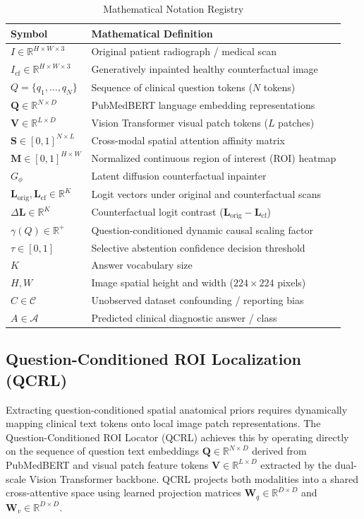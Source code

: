\documentclass[journal,twoside,web]{ieeecolor}
\begin{document}
\begin{table}[h]
\caption{Mathematical Notation Registry}
\label{tab:notation}
\centering
\begin{tabular}{ll}
\toprule
\textbf{Symbol} & \textbf{Mathematical Definition} \\
\midrule
$I \in \mathbb{R}^{H \times W \times 3}$ & Original patient radiograph / medical scan \\
$I_{\text{cf}} \in \mathbb{R}^{H \times W \times 3}$ & Generatively inpainted healthy counterfactual image \\
$Q = \{q_1, \dots, q_N\}$ & Sequence of clinical question tokens ($N$ tokens) \\
$\mathbf{Q} \in \mathbb{R}^{N \times D}$ & PubMedBERT language embedding representations \\
$\mathbf{V} \in \mathbb{R}^{L \times D}$ & Vision Transformer visual patch tokens ($L$ patches) \\
$\mathbf{S} \in [0, 1]^{N \times L}$ & Cross-modal spatial attention affinity matrix \\
$\mathbf{M} \in [0, 1]^{H \times W}$ & Normalized continuous region of interest (ROI) heatmap \\
$G_{\phi}$ & Latent diffusion counterfactual inpainter \\
$\mathbf{L}_{\text{orig}}, \mathbf{L}_{\text{cf}} \in \mathbb{R}^K$ & Logit vectors under original and counterfactual scans \\
$\Delta \mathbf{L} \in \mathbb{R}^K$ & Counterfactual logit contrast ($\mathbf{L}_{\text{orig}} - \mathbf{L}_{\text{cf}}$) \\
$\gamma(Q) \in \mathbb{R}^{+}$ & Question-conditioned dynamic causal scaling factor \\
$\tau \in [0, 1]$ & Selective abstention confidence decision threshold \\
$K$ & Answer vocabulary size \\
$H, W$ & Image spatial height and width ($224 \times 224$ pixels) \\
$C \in \mathcal{C}$ & Unobserved dataset confounding / reporting bias \\
$A \in \mathcal{A}$ & Predicted clinical diagnostic answer / class \\
\bottomrule
\end{tabular}
\end{table}

\subsection{Question-Conditioned ROI Localization (QCRL)}
Extracting question-conditioned spatial anatomical priors requires dynamically mapping clinical text tokens onto local image patch representations. The Question-Conditioned ROI Locator (QCRL) achieves this by operating directly on the sequence of question text embeddings $\mathbf{Q} \in \mathbb{R}^{N \times D}$ derived from PubMedBERT and visual patch feature tokens $\mathbf{V} \in \mathbb{R}^{L \times D}$ extracted by the dual-scale Vision Transformer backbone. QCRL projects both modalities into a shared cross-attentive space using learned projection matrices $\mathbf{W}_q \in \mathbb{R}^{D \times D}$ and $\mathbf{W}_v \in \mathbb{R}^{D \times D}$.
\end{document}
